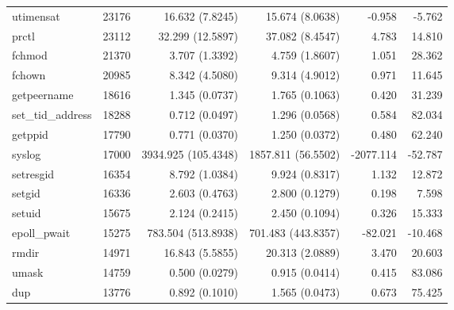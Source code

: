 \begin{longtable}{>{\ttfamily}lrrrrr}
                      utimensat &      23176 &          16.632 (7.8245) &          15.674 (8.0638) &          -0.958 &       -5.762 \\
                          prctl &      23112 &         32.299 (12.5897) &          37.082 (8.4547) &           4.783 &       14.810 \\
                         fchmod &      21370 &           3.707 (1.3392) &           4.759 (1.8607) &           1.051 &       28.362 \\
                         fchown &      20985 &           8.342 (4.5080) &           9.314 (4.9012) &           0.971 &       11.645 \\
                    getpeername &      18616 &           1.345 (0.0737) &           1.765 (0.1063) &           0.420 &       31.239 \\
              set\_tid\_address &      18288 &           0.712 (0.0497) &           1.296 (0.0568) &           0.584 &       82.034 \\
                        getppid &      17790 &           0.771 (0.0370) &           1.250 (0.0372) &           0.480 &       62.240 \\
                         syslog &      17000 &      3934.925 (105.4348) &       1857.811 (56.5502) &       -2077.114 &      -52.787 \\
                      setresgid &      16354 &           8.792 (1.0384) &           9.924 (0.8317) &           1.132 &       12.872 \\
                         setgid &      16336 &           2.603 (0.4763) &           2.800 (0.1279) &           0.198 &        7.598 \\
                         setuid &      15675 &           2.124 (0.2415) &           2.450 (0.1094) &           0.326 &       15.333 \\
                   epoll\_pwait &      15275 &       783.504 (513.8938) &       701.483 (443.8357) &         -82.021 &      -10.468 \\
                          rmdir &      14971 &          16.843 (5.5855) &          20.313 (2.0889) &           3.470 &       20.603 \\
                          umask &      14759 &           0.500 (0.0279) &           0.915 (0.0414) &           0.415 &       83.086 \\
                            dup &      13776 &           0.892 (0.1010) &           1.565 (0.0473) &           0.673 &       75.425 \\

\end{longtable}
